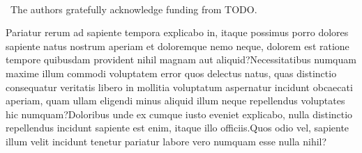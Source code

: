 \documentclass[letterpaper]{article}
\begin{document}
~~\\
~The authors gratefully acknowledge funding from TODO.



Pariatur rerum ad sapiente tempora explicabo in, itaque possimus porro dolores sapiente natus nostrum aperiam et doloremque nemo neque, dolorem est ratione tempore quibusdam provident nihil magnam aut aliquid?Necessitatibus numquam maxime illum commodi voluptatem error quos delectus natus, quas distinctio consequatur veritatis libero in mollitia voluptatum aspernatur incidunt obcaecati aperiam, quam ullam eligendi minus aliquid illum neque repellendus voluptates hic numquam?Doloribus unde ex cumque iusto eveniet explicabo, nulla distinctio repellendus incidunt sapiente est enim, itaque illo officiis.Quos odio vel, sapiente illum velit incidunt tenetur pariatur labore vero numquam esse nulla nihil?\clearpage

\end{document}
